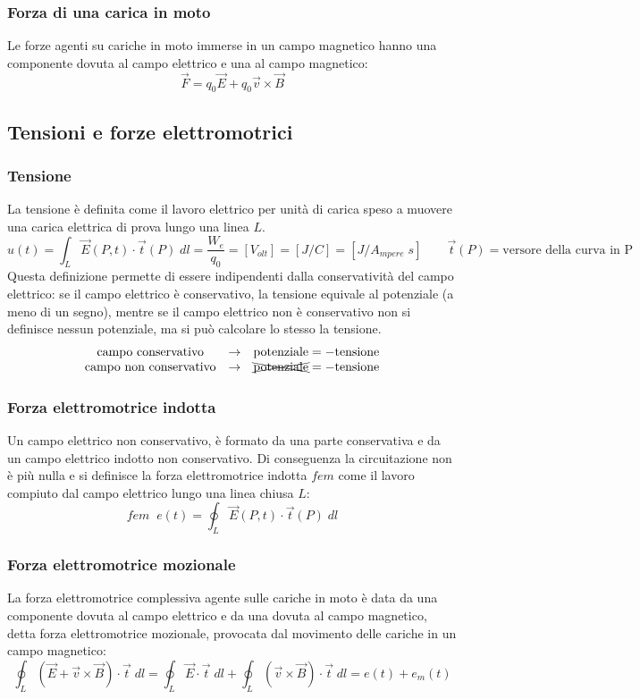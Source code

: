 \documentclass[a4paper]{article}
\begin{document}
\subsubsection*{Forza di una carica in moto}
Le forze agenti su cariche in moto immerse in un campo magnetico hanno una componente dovuta al campo elettrico e una al campo
magnetico: \[\vec{F} = q_0 \vec{E} + q_0 \vec{v} \times \vec{B}\]

\subsection{Tensioni e forze elettromotrici}
\subsubsection*{Tensione}
La tensione è definita come il lavoro elettrico per unità di carica speso a muovere una carica elettrica di prova lungo una linea \(L\).
\[u(t) = \int_L \vec{E}(P,t) \cdot \vec{t}(P) \; dl = \frac{W_e}{q_0} = [V_{olt}] = [J/C] = [J/A_{mpere} \;\! s] \qquad \vec{t}(P) = \text{versore della curva in P} \]
Questa definizione permette di essere indipendenti dalla conservatività del campo elettrico: se il campo elettrico è conservativo,
la tensione equivale al potenziale (a meno di un segno), mentre se il campo elettrico non è conservativo non si definisce nessun
potenziale, ma si può calcolare lo stesso la tensione.
\[\begin{matrix}
	\text{campo conservativo} & \rightarrow & \text{potenziale} = -\text{tensione} \\
	\text{campo non conservativo} & \rightarrow & \xcancel{\text{potenziale}} = -\text{tensione}
\end{matrix}\]

\subsubsection*{Forza elettromotrice indotta}
Un campo elettrico non conservativo, è formato da una parte conservativa e da un campo elettrico indotto non conservativo.
Di conseguenza la circuitazione non è più nulla e si definisce la forza elettromotrice indotta \(fem\) come il lavoro
compiuto dal campo elettrico lungo una linea chiusa \(L\):
\[fem \;\; e(t) = \oint_L \vec{E}(P,t) \cdot \vec{t}(P) \; dl\]

\subsubsection*{Forza elettromotrice mozionale}
La forza elettromotrice complessiva agente sulle cariche in moto è data da una componente dovuta al campo elettrico e da una
dovuta al campo magnetico, detta forza elettromotrice mozionale, provocata dal movimento delle cariche in un campo magnetico:
\[\oint_L (\vec{E} + \vec{v}\times \vec{B}) \cdot \vec{t} \; dl = \oint_L \vec{E} \cdot \vec{t} \; dl +  \oint_L (\vec{v} \times \vec{B}) \cdot \vec{t} \; dl = e(t) + e_m(t)\]
\end{document}
